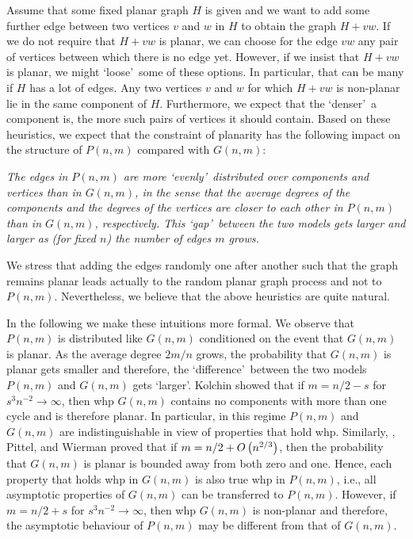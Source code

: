 Assume that some fixed planar graph $H$ is given and we want to add some further edge between two vertices $v$ and $w$ in $H$ to obtain the graph $H+vw$. If we do not require that $H+vw$ is planar, we can choose for the edge $vw$ any pair of vertices between which there is no edge yet. However, if we insist that $H+vw$ is planar, we might \lq loose\rq\ some of these options. In particular, that can be many if $H$ has a lot of edges. Any two vertices $v$ and $w$ for which $H+vw$ is non-planar lie in the same component of $H$. Furthermore, we expect that the \lq denser\rq\ a component is, the more such pairs of vertices it should contain. Based on these heuristics, we expect that the constraint of planarity has the following impact on the structure of $P(n,m)$ compared with $G(n,m)$:

{\em The edges in $P(n,m)$ are more \lq evenly\rq\ distributed over components and vertices than in $G(n,m)$, in the sense that the average degrees of the components and the degrees of the vertices are closer to each other in $P(n,m)$ than in $G(n,m)$, respectively. This \lq gap\rq\ between the two models gets larger and larger as (for fixed $n$) the number of edges $m$ grows.}

We stress that adding the edges randomly one after another such that the graph remains planar leads actually to the random planar graph process and not to $P(n,m)$. Nevertheless, we believe that the above heuristics are quite natural. 

In the following we make these intuitions more formal. We observe that $P(n,m)$ is distributed like $G(n,m)$ conditioned on the event that $G(n,m)$ is planar. As the average degree $2m/n$ grows, the probability that $G(n,m)$ is planar gets smaller and therefore, the \lq difference\rq\ between the two models $P(n,m)$ and $G(n,m)$ gets \lq larger\rq. Kolchin \cite{Kolchin1986} showed that if $m=n/2-s$ for $s^3n^{-2}\to \infty$, then whp $G(n,m)$ contains no components with more than one cycle and is therefore planar. In particular, in this regime $P(n,m)$ and $G(n,m)$ are indistinguishable in view of properties that hold whp. Similarly, \Luczak, Pittel, and Wierman \cite{LuczakPittelWierman1994} proved that if $m=n/2+O\left(n^{2/3}\right)$, then the probability that $G(n,m)$ is planar is bounded away from both zero and one. Hence, each property that holds whp in $G(n,m)$ is also true whp in $P(n,m)$, i.e., all asymptotic properties of $G(n,m)$ can be transferred to $P(n,m)$. However, if $m=n/2+s$ for $s^3n^{-2}\to \infty$, then whp $G(n,m)$ is non-planar \cite{LuczakPittelWierman1994} and therefore, the asymptotic behaviour of $P(n,m)$ may be different from that of $G(n,m)$.

